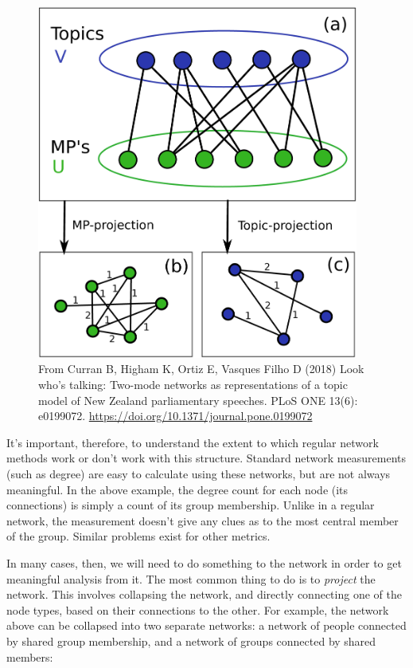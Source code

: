 \documentclass[
]{book}
\begin{document}
\begin{figure}
\centering
\includegraphics[width=4.16667in,height=\textheight]{images/nz_topics.png}
\caption{From Curran B, Higham K, Ortiz E, Vasques Filho D (2018) Look who's talking: Two-mode networks as representations of a topic model of New Zealand parliamentary speeches. PLoS ONE 13(6): e0199072. \url{https://doi.org/10.1371/journal.pone.0199072}}
\end{figure}

It's important, therefore, to understand the extent to which regular network methods work or don't work with this structure. Standard network measurements (such as degree) are easy to calculate using these networks, but are not always meaningful. In the above example, the degree count for each node (its connections) is simply a count of its group membership. Unlike in a regular network, the measurement doesn't give any clues as to the most central member of the group. Similar problems exist for other metrics.

In many cases, then, we will need to do something to the network in order to get meaningful analysis from it. The most common thing to do is to \emph{project} the network. This involves collapsing the network, and directly connecting one of the node types, based on their connections to the other. For example, the network above can be collapsed into two separate networks: a network of people connected by shared group membership, and a network of groups connected by shared members:
\end{document}
